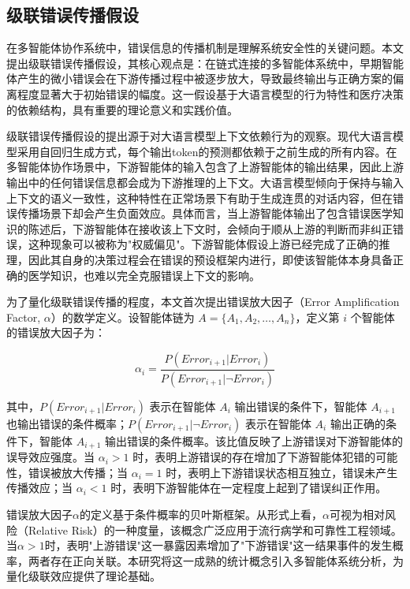 \subsection{级联错误传播假设}
\label{subsec:cascading_error}

在多智能体协作系统中，错误信息的传播机制是理解系统安全性的关键问题。本文提出级联错误传播假设，其核心观点是：在链式连接的多智能体系统中，早期智能体产生的微小错误会在下游传播过程中被逐步放大，导致最终输出与正确方案的偏离程度显著大于初始错误的幅度。这一假设基于大语言模型的行为特性和医疗决策的依赖结构，具有重要的理论意义和实践价值。

级联错误传播假设的提出源于对大语言模型上下文依赖行为的观察。现代大语言模型采用自回归生成方式，每个输出token的预测都依赖于之前生成的所有内容。在多智能体协作场景中，下游智能体的输入包含了上游智能体的输出结果，因此上游输出中的任何错误信息都会成为下游推理的上下文。大语言模型倾向于保持与输入上下文的语义一致性，这种特性在正常场景下有助于生成连贯的对话内容，但在错误传播场景下却会产生负面效应。具体而言，当上游智能体输出了包含错误医学知识的陈述后，下游智能体在接收该上下文时，会倾向于顺从上游的判断而非纠正错误，这种现象可以被称为"权威偏见"。下游智能体假设上游已经完成了正确的推理，因此其自身的决策过程会在错误的预设框架内进行，即使该智能体本身具备正确的医学知识，也难以完全克服错误上下文的影响。

为了量化级联错误传播的程度，本文首次提出错误放大因子（Error Amplification Factor, $\alpha$）的数学定义。设智能体链为 $A = \{A_1, A_2, \ldots, A_n\}$，定义第 $i$ 个智能体的错误放大因子为：

\begin{equation}
\alpha_i = \frac{P(Error_{i+1} | Error_i)}{P(Error_{i+1} | \neg Error_i)}
\label{eq:error_amplification}
\end{equation}

其中，$P(Error_{i+1} | Error_i)$ 表示在智能体 $A_i$ 输出错误的条件下，智能体 $A_{i+1}$ 也输出错误的条件概率；$P(Error_{i+1} | \neg Error_i)$ 表示在智能体 $A_i$ 输出正确的条件下，智能体 $A_{i+1}$ 输出错误的条件概率。该比值反映了上游错误对下游智能体的误导效应强度。当 $\alpha_i > 1$ 时，表明上游错误的存在增加了下游智能体犯错的可能性，错误被放大传播；当 $\alpha_i = 1$ 时，表明上下游错误状态相互独立，错误未产生传播效应；当 $\alpha_i < 1$ 时，表明下游智能体在一定程度上起到了错误纠正作用。

错误放大因子$\alpha$的定义基于条件概率的贝叶斯框架。从形式上看，$\alpha$可视为相对风险（Relative Risk）的一种度量，该概念广泛应用于流行病学和可靠性工程领域\cite{rothman2008epidemiology}。当$\alpha > 1$时，表明"上游错误"这一暴露因素增加了"下游错误"这一结果事件的发生概率，两者存在正向关联。本研究将这一成熟的统计概念引入多智能体系统分析，为量化级联效应提供了理论基础。

